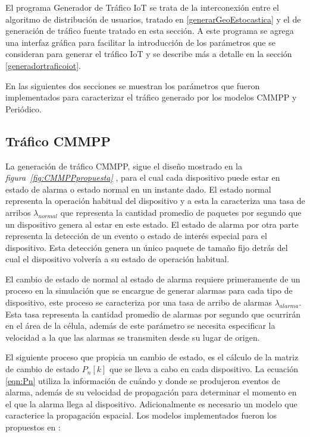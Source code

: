 El programa Generador de Tráfico IoT se trata de la interconexión entre el algoritmo de distribución de usuarios, tratado en \ref{generarGeoEstocastica} y el de generación de tráfico fuente tratado en esta sección. A este programa se agrega una interfaz gráfica para facilitar la introducción de los parámetros que se consideran para generar el tráfico IoT y  se  describe más a detalle en la sección \ref{generadortraficoiot}. \newline

En las siguientes dos secciones se muestran los parámetros que fueron implementados para caracterizar el tráfico generado por los modelos CMMPP y Periódico. \newline
\subsection{Tráfico CMMPP}
La generación de tráfico CMMPP, sigue el diseño mostrado en la \textit{figura~\ref{fig:CMMPPpropuesta}} , para el cual cada dispositivo puede estar en estado de alarma o estado normal en un instante dado. El estado normal representa la operación habitual del dispositivo y a esta la caracteriza una tasa de arribos $ \lambda_{normal}$ que representa la cantidad promedio de paquetes por segundo que un dispositivo genera al estar en este estado. El estado de alarma por otra parte representa la detección de un evento o estado de interés especial para el dispositivo. Esta detección genera un único paquete de tamaño fijo detrás del cual el dispositivo volvería a su estado de operación habitual.\newline

El cambio de estado de normal  al estado de alarma requiere primeramente de un proceso en la simulación que se encargue de generar alarmas para cada tipo de dispositivo, este proceso se caracteriza por una tasa de arribo de alarmas $ \lambda_{alarma}$. Esta tasa representa la cantidad promedio de alarmas por segundo que ocurrirán en el área de la célula, además de este parámetro se necesita especificar la velocidad a la que las alarmas se transmiten desde su lugar de origen.\newline

El siguiente proceso que propicia un cambio de estado, es el cálculo de la matriz de cambio de estado $P_n\left[k\right]$ que se lleva a cabo en cada dispositivo. La ecuación \ref{eqn:Pn} utiliza la información de cuándo y donde se produjeron eventos de alarma, además de su velocidad de propagación para determinar el momento en el que la alarma llega al dispositivo. Adicionalmente es necesario un modelo que caracterice la propagación espacial. Los modelos implementados fueron los propuestos en \parencite{Gupta2018} :\newline

